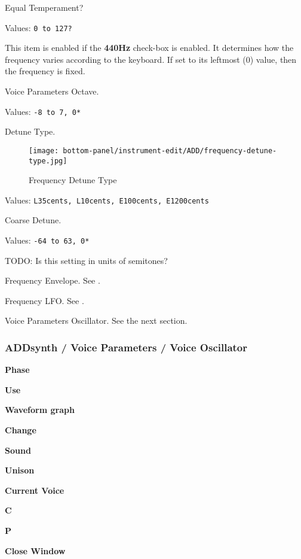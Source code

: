    Equal Temperament?

   Values: \texttt{0 to 127?}

   This item is enabled if the \textbf{440Hz} check-box is enabled.
   It determines how the frequency varies according to the 
   keyboard.  If set to its leftmost (0) value, then the frequency is fixed.

   Voice Parameters Octave.

   Values: \texttt{-8 to 7, 0*}

%

   Detune Type.

\begin{figure}[H]
   \centering 
   \texttt{[image: bottom-panel/instrument-edit/ADD/frequency-detune-type.jpg]}
   \caption{Frequency Detune Type}
   \label{fig:frequency_detune_tYpe}
\end{figure}

   Values: \texttt{L35cents, L10cents, E100cents, E1200cents}

   Coarse Detune.

   Values: \texttt{-64 to 63, 0*}

   TODO: Is this setting in units of semitones?

   Frequency Envelope.
   See .

   Frequency LFO.
   See .

   Voice Parameters Oscillator.
   See the next section.

\subsubsection{ADDsynth / Voice Parameters / Voice Oscillator}
\label{subsubsec:addsynth_voice_parameters_oscillator}

   \begin{enumber}
      \item \textbf{Phase}
      \item \textbf{Use}
      \item \textbf{Waveform graph}
      \item \textbf{Change}
      \item \textbf{Sound}
      \item \textbf{Unison}
      \item \textbf{Current Voice}
      \item \textbf{C}
      \item \textbf{P}
      \item \textbf{Close Window}
   \end{enumber}

